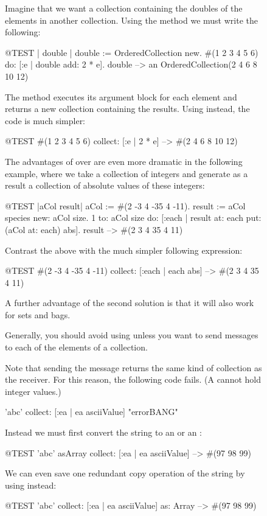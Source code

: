 \documentclass[a4paper,10pt,twoside]{book}
\begin{document}
\begin{figure}
\begin{center}
Imagine that we want a collection containing the doubles of the elements in another collection.
Using the method  we must write the following:

\begin{code}{@TEST | double |}
double := OrderedCollection new.
#(1 2 3 4 5 6) do: [:e | double add: 2 * e].
double --> an OrderedCollection(2 4 6 8 10 12)
\end{code}

\noindent
The method  executes its argument block for each element and returns a new collection containing the results. 
Using  instead, the code is much simpler:
\begin{code}{@TEST}
#(1 2 3 4 5 6) collect: [:e | 2 * e] --> #(2 4 6 8 10 12)
\end{code}

The advantages of  over  are even more dramatic in the following example, where we take a collection of integers and generate as a result a collection of absolute values of these integers:

\begin{code}{@TEST |aCol result|}
aCol :=  #(2 -3 4 -35 4 -11).
result := aCol species new: aCol size.
1 to: aCol size do: [:each | result at: each put: (aCol at: each) abs].
result --> #(2 3 4 35 4 11)
\end{code}
\noindent
Contrast the above with the much simpler following expression:
\begin{code}{@TEST}
#(2 -3 4 -35 4 -11) collect: [:each | each abs] --> #(2 3 4 35 4 11)
\end{code}
\noindent
A further advantage of the second solution is that it will also work for sets and bags.

Generally, you should avoid using  unless you want to send messages to each of the elements of a collection.

Note that sending the message  returns the same kind of collection as the receiver.
For this reason, the following code fails.
(A  cannot hold integer values.)
\begin{code}{}
'abc' collect: [:ea | ea asciiValue]      "errorBANG"
\end{code}
\noindent
Instead we must first convert the string to an  or an :
\begin{code}{@TEST}
'abc' asArray collect: [:ea | ea asciiValue] --> #(97 98 99)
\end{code}
We can even save one redundant copy operation of the string by using  instead:
\begin{code}{@TEST}
'abc' collect: [:ea | ea asciiValue] as: Array --> #(97 98 99)
\end{code}


\end{center}
\end{figure}
\end{document}
